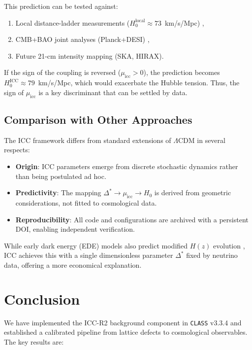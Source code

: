 \documentclass[11pt,a4paper]{article}
\newcommand{\lcdm}{\Lambda\mathrm{CDM}}
\newcommand{\DeltaStar}{\Delta^{\ast}}
\newcommand{\muicc}{\mu_{\mathrm{icc}}}
\newcommand{\class}{\texttt{CLASS}}
\begin{document}
This prediction can be tested against:
\begin{enumerate}[label=\arabic*.]
    \item Local distance-ladder measurements ($H_0^{\mathrm{local}} \approx 73$~km/s/Mpc) \cite{riess2022},
    \item CMB+BAO joint analyses (Planck+DESI) \cite{planck2018, desi2024},
    \item Future 21-cm intensity mapping (SKA, HIRAX).
\end{enumerate}

If the sign of the coupling is reversed ($\muicc > 0$), the prediction becomes $H_0^{\mathrm{ICC}} \approx 79$~km/s/Mpc, which would exacerbate the Hubble tension. Thus, the sign of $\muicc$ is a key discriminant that can be settled by data.

\subsection{Comparison with Other Approaches}
\label{subsec:comparison}

The ICC framework differs from standard extensions of $\lcdm$ in several respects:
\begin{itemize}
    \item \textbf{Origin}: ICC parameters emerge from discrete stochastic dynamics rather than being postulated ad hoc.
    \item \textbf{Predictivity}: The mapping $\DeltaStar \to \muicc \to H_0$ is derived from geometric considerations, not fitted to cosmological data.
    \item \textbf{Reproducibility}: All code and configurations are archived with a persistent DOI, enabling independent verification.
\end{itemize}

While early dark energy (EDE) models also predict modified $H(z)$ evolution \cite{poulin2019}, ICC achieves this with a single dimensionless parameter $\DeltaStar$ fixed by neutrino data, offering a more economical explanation.

\section{Conclusion}
\label{sec:conclusion}

We have implemented the ICC-R2 background component in \class{} v3.3.4 and established a calibrated pipeline from lattice defects to cosmological observables. The key results are:
\end{document}
